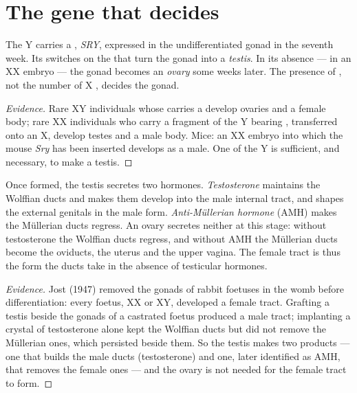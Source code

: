 \section{The gene that decides}

\begin{proposition}\label{prop:g11:becoming-male-female:sry}
The Y  carries a , \emph{SRY}, expressed
in the undifferentiated gonad in the seventh week. Its 
switches on the  that turn the gonad into a \emph{testis}. In
its absence --- in an XX embryo --- the gonad becomes an
\emph{ovary} some weeks later. The presence of , not the number of
X , decides the gonad.
\end{proposition}
\begin{proof}[Evidence]
Rare XY individuals whose  carries a  develop
ovaries and a female body; rare XX individuals who carry a fragment
of the Y bearing , transferred onto an X, develop testes and a
male body. Mice: an XX embryo into which the mouse \emph{Sry} 
has been inserted develops as a male. One  of the Y is
sufficient, and necessary, to make a testis.
\end{proof}

\begin{proposition}\label{prop:g11:becoming-male-female:hormones}
Once formed, the testis secretes two hormones. \emph{Testosterone}
maintains the Wolffian ducts and makes them develop into the male
internal tract, and shapes the external genitals in the male form.
\emph{Anti-Müllerian hormone} (AMH) makes the Müllerian ducts
regress. An ovary secretes neither at this stage: without
testosterone the Wolffian ducts regress, and without AMH the Müllerian
ducts become the oviducts, the uterus and the upper vagina. The female
tract is thus the form the ducts take in the absence of testicular
hormones.
\end{proposition}
\begin{proof}[Evidence]
Jost (1947) removed the gonads of rabbit foetuses in the womb before
differentiation: every foetus, XX or XY, developed a female tract.
Grafting a testis beside the gonads of a castrated foetus produced a
male tract; implanting a crystal of testosterone alone kept the
Wolffian ducts but did not remove the Müllerian ones, which persisted
beside them. So the testis makes two products --- one that builds the
male ducts (testosterone) and one, later identified as AMH, that
removes the female ones --- and the ovary is not needed for the
female tract to form.
\end{proof}

